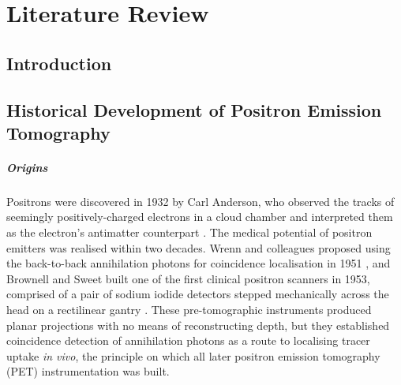 \chapter{Literature Review}
\label{ch:literature-review}

\section{Introduction}
\label{sec:review-introduction}

\section{Historical Development of Positron Emission Tomography}
\label{sec:history}

\paragraph{Origins}
Positrons were discovered in 1932 by Carl Anderson, who observed the tracks of seemingly positively-charged electrons in a cloud chamber and interpreted them as the electron's antimatter counterpart \cite{Anderson1933}.
The medical potential of positron emitters was realised within two decades.
Wrenn and colleagues proposed using the back-to-back annihilation photons for coincidence localisation in 1951 \cite{Wrenn1951}, and Brownell and Sweet built one of the first clinical positron scanners in 1953, comprised of a pair of sodium iodide detectors stepped mechanically across the head on a rectilinear gantry \cite{Sweet1953}.
These pre-tomographic instruments produced planar projections with no means of reconstructing depth, but they established coincidence detection of annihilation photons as a route to localising tracer uptake \emph{in vivo}, the principle on which all later positron emission tomography (PET) instrumentation was built.

